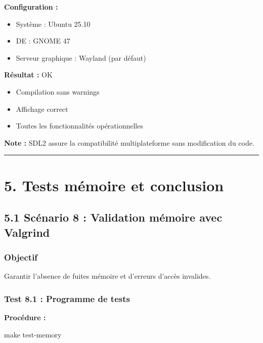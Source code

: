 \documentclass[
]{article}
\newcommand{\OK}{OK~\twemoji{white_check_mark}}
\newcommand{\OK}{OK~\twemoji{white_check_mark}}
\newenvironment{Shaded}{}{}
\newcommand{\FunctionTok}[1]{\textcolor[rgb]{0.02,0.16,0.49}{#1}}
\newcommand{\NormalTok}[1]{#1}
\providecommand{\tightlist}{%
  \setlength{\itemsep}{0pt}\setlength{\parskip}{0pt}}
\begin{document}
\textbf{Configuration :}

\begin{itemize}
\tightlist
\item
  Système : Ubuntu 25.10
\item
  DE : GNOME 47
\item
  Serveur graphique : Wayland (par défaut)
\end{itemize}

\textbf{Résultat :} \OK

\begin{itemize}
\tightlist
\item
  Compilation sans warnings
\item
  Affichage correct
\item
  Toutes les fonctionnalités opérationnelles
\end{itemize}

\textbf{Note :} SDL2 assure la compatibilité multiplateforme sans
modification du code.

\begin{center}\rule{0.5\linewidth}{0.5pt}\end{center}

\section{5. Tests mémoire et
conclusion}\label{tests-muxe9moire-et-conclusion}

\subsection{5.1 Scénario 8 : Validation mémoire avec
Valgrind}\label{scuxe9nario-8-validation-muxe9moire-avec-valgrind}

\subsubsection{Objectif}\label{objectif-6}

Garantir l'absence de fuites mémoire et d'erreurs d'accès invalides.

\subsubsection{Test 8.1 : Programme de
tests}\label{test-8.1-programme-de-tests}

\textbf{Procédure :}

\begin{Shaded}
\begin{Highlighting}[]
\FunctionTok{make}\NormalTok{ test{-}memory}
\end{Highlighting}
\end{Shaded}
\end{document}
